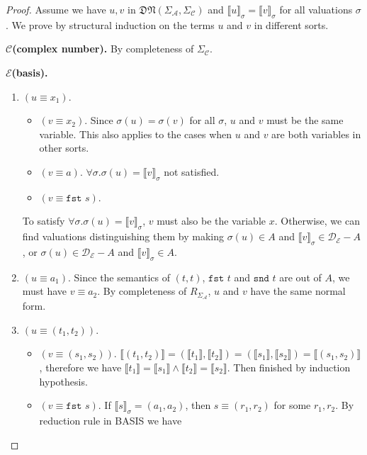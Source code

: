 \documentclass[manuscript, review, timestamp]{acmart}
\newcommand*{\fst}{\texttt{fst }}
\newcommand*{\snd}{\texttt{snd }}
\newcommand*{\sem}[1]{\llbracket #1 \rrbracket}
\begin{document}
\begin{proof}
  Assume we have $u, v$ in $\mathfrak{DN}(\Sigma_\mathcal{A}, \Sigma_\mathcal{C})$ and $\sem{u}_\sigma = \sem{v}_\sigma$ for all valuations $\sigma$. 
  We prove by structural induction on the terms $u$ and $v$ in different sorts.
  
  \textbf{$\mathcal{C}$(complex number).} By completeness of $\Sigma_\mathcal{C}$.

  \textbf{$\mathcal{E}$(basis).} 
   
  \begin{enumerate}
    \item $(u \equiv x_1)$. 
    \begin{itemize}
      \item $(v \equiv x_2)$. Since $\sigma(u) = \sigma(v)$ for all $\sigma$, $u$ and $v$ must be the same variable. This also applies to the cases when $u$ and $v$ are both variables in other sorts.
      \item $(v \equiv a)$. $\forall \sigma. \sigma(u) = \sem{v}_\sigma$ not satisfied.
      \item $(v \equiv \fst s)$. 
    \end{itemize}
    To satisfy $\forall \sigma. \sigma(u) = \sem{v}_\sigma$, $v$ must also be the variable $x$. Otherwise, we can find valuations distinguishing them by making $\sigma(u) \in A$ and $\sem{v}_\sigma \in \mathcal{D}_{\mathcal{E}} - A$, or $\sigma(u) \in \mathcal{D}_{\mathcal{E}} - A$ and $\sem{v}_\sigma \in A$.
    \item $(u \equiv a_1)$. Since the semantics of $(t, t)$, $\fst t$ and $\snd t$ are out of $A$, we must have $v \equiv a_2$. By completeness of $R_{\Sigma_\mathcal{A}}$, $u$ and $v$ have the same normal form.
    \item $(u \equiv (t_1, t_2))$. 
      \begin{itemize}
        \item $(v \equiv (s_1, s_2))$. $\sem{(t_1, t_2)} = (\sem{t_1}, \sem{t_2}) = (\sem{s_1}, \sem{s_2}) = \sem{(s_1, s_2)}$, therefore we have $\sem{t_1} = \sem{s_1} \wedge \sem{t_2} = \sem{s_2}$. Then finished by induction hypothesis.
        \item $(v \equiv \fst s)$. If $\sem{s}_\sigma = (a_1, a_2)$, then $s \equiv (r_1, r_2)$ for some $r_1, r_2$. By reduction rule in \textsc{BASIS} we have 
      \end{itemize}
  \end{enumerate}


\end{proof}
\end{document}
